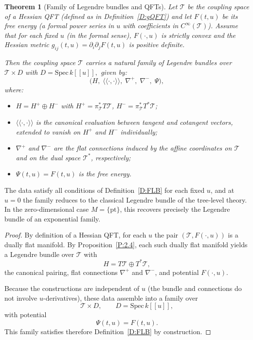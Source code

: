 \documentclass[12pt]{amsart}
\newcommand{\cT}{\mathcal{T}}
\newtheorem{thm}{Theorem}
\begin{document}
 \begin{thm}[Family of Legendre bundles and QFTs]
\label{T:1}
Let $\cT$ be the coupling space of a Hessian QFT (defined as in Definition~\ref{D:gQFT}) and let $F(t,u)$ be its free energy (a formal power series in $u$ with coefficients in $C^\infty(\cT)$). Assume that for each fixed $u$ (in the formal sense), $F(\cdot,u)$ is strictly convex and the Hessian metric
$g_{ij}(t,u) = \partial_i \partial_j F(t,u)$ is positive definite.

Then the coupling space $\cT$ carries a natural family of Legendre bundles over $\cT \times D$ with $D = \mathrm{Spec}\, k[[u]],$ given by:
\[
\bigl( H,\; \langle\!\langle\cdot,\cdot\rangle\!\rangle,\; \nabla^+,\; \nabla^-,\; \Psi \bigr),
\]
where:
\begin{itemize}
    \item $H = H^+ \oplus H^-$ with $H^+ = \pi_{\mathcal{T}}^*T\mathcal{T}$, $H^- = \pi_{\mathcal{T}}^*T^*\mathcal{T}$;
    \item $\langle\!\langle\cdot,\cdot\rangle\!\rangle$ is the canonical evaluation between tangent and cotangent vectors, extended to vanish on $H^+$ and $H^-$ individually;
    \item $\nabla^+$ and $\nabla^-$ are the flat connections induced by the affine coordinates on $\mathcal{T}$ and on the dual space $\mathcal{T}^*$, respectively;
    \item $\Psi(t,u) = F(t,u)$ is the free energy.
\end{itemize}
\end{thm}
The data satisfy all conditions of Definition~\ref{D:FLB} for each fixed $u$, and at $u=0$ the family reduces to the classical Legendre bundle of the tree‑level theory. In the zero‑dimensional case $M=\{\mathrm{pt}\}$, this recovers precisely the Legendre bundle of an exponential family.
\begin{proof}
By definition of a Hessian QFT, for each $u$ the pair $(\cT, F(\cdot,u))$ is a dually flat manifold.  
By Proposition~\ref{P:2.4}, each such dually flat manifold yields a Legendre bundle over $\cT$ with 
\[
    H = T\cT \oplus T^*\cT,
\] 
the canonical pairing, flat connections $\nabla^+$ and $\nabla^-$, and potential $F(\cdot,u)$.  

Because the constructions are independent of $u$ (the bundle and connections do not involve $u$-derivatives), these data assemble into a family over 
\[
    \cT \times D, \qquad D = \mathrm{Spec}\, k[[u]],
\] 
with potential 
\[
    \Psi(t,u) = F(t,u).
\] 
This family satisfies therefore Definition~\ref{D:FLB} by construction.

 \end{proof}
\end{document}
